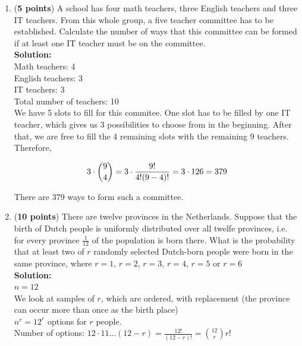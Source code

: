 \documentclass[a4paper]{article}
\begin{document}
\begin{enumerate}
\item (\textbf{5 points}) A school has four math teachers, three English teachers and three IT teachers. From this whole group, a five teacher committee has to be established. Calculate the number of ways that this committee can be formed if at least one IT teacher must be on the committee.\\
\textbf{Solution:}\\


Math teachers: 4\\
English teachers: 3\\
IT teachers: 3\\
Total number of teachers: 10\\

We have 5 slots to fill for this commitee. One slot has to be filled by one IT teacher, which gives us 3 possibilities to choose from in the beginning. After that, we are free to fill the 4 remaining slots with the remaining 9 teachers.\\
Therefore,

\begin{align}
 3 \cdot {9 \choose 4} = 3 \cdot \frac{9!}{4!(9-4)!} = 3 \cdot 126 = 379\notag
\end{align}

There are 379 ways to form such a committee.\\

\item (\textbf{10 points}) There are twelve provinces in the Netherlands. Suppose that the birth of Dutch people is uniformly distributed over all twelfe provinces, i.e. for every province $\frac{1}{12}$ of the population is born there. What is the probability that at least two of $r$ randomly selected Dutch-born people were born in the same province, where $r = 1$, $r = 2$, $r = 3$, $r = 4$, $r = 5$ or $r = 6$\\
\textbf{Solution:}\\

$n = 12$\\

We look at samples of $r$, which are ordered, with replacement (the province can occur more than once as the birth place)\\


$n^r = 12^r$ options for $r$ people.\\

Number of options: $12 \cdot 11 ... (12 - r) = \frac{12!}{(12-r)!} = {12 \choose r}r!$	
	

\end{enumerate}
\end{document}
